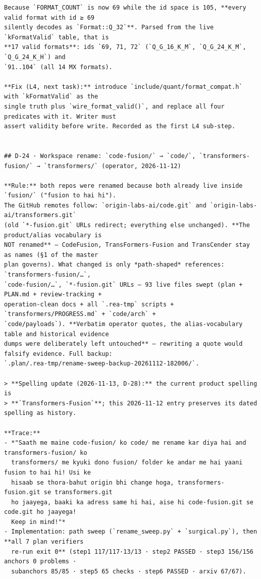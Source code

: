 \begin{verbatim}
Because `FORMAT_COUNT` is now 69 while the id space is 105, **every valid format with id ≥ 69
silently decodes as `Format::Q_32`**. Parsed from the live `kFormatValid` table, that is
**17 valid formats**: ids `69, 71, 72` (`Q_G_16_K_M`, `Q_G_24_K_M`, `Q_G_24_K_H`) and
`91..104` (all 14 MX formats).

**Fix (L4, next task):** introduce `include/quant/format_compat.h` with `kFormatValid` as the
single truth plus `wire_format_valid()`, and replace all four predicates with it. Writer must
assert validity before write. Recorded as the first L4 sub-step.


## D-24 · Workspace rename: `code-fusion/` → `code/`, `transformers-fusion/` → `transformers/` (operator, 2026-11-12)

**Rule:** both repos were renamed because both already live inside `fusion/` ("fusion to hai hi").
The GitHub remotes follow: `origin-labs-ai/code.git` and `origin-labs-ai/transformers.git`
(old `*-fusion.git` URLs redirect; everything else unchanged). **The product/alias vocabulary is
NOT renamed** — CodeFusion, TransFormers-Fusion and TransCender stay as names (§1 of the master
plan governs). What changed is only *path-shaped* references: `transformers-fusion/…`,
`code-fusion/…`, `*-fusion.git` URLs — 93 live files swept (plan + PLAN.md + review-tracking +
operation-clean docs + all `.rea-tmp` scripts + `transformers/PROGRESS.md` + `code/arch` +
`code/payloads`). **Verbatim operator quotes, the alias-vocabulary table and historical evidence
dumps were deliberately left untouched** — rewriting a quote would falsify evidence. Full backup:
`.plan/.rea-tmp/rename-sweep-backup-20261112-182006/`.

> **Spelling update (2026-11-13, D-28):** the current product spelling is
> **`Transformers-Fusion`**; this 2026-11-12 entry preserves its dated spelling as history.

**Trace:**
- *"Saath me maine code-fusion/ ko code/ me rename kar diya hai and transformers-fusion/ ko
  transformers/ me kyuki dono fusion/ folder ke andar me hai yaani fusion to hai hi! Usi ke
  hisaab se thora-bahut origin bhi change hoga, transformers-fusion.git se transformers.git
  ho jaayega, baaki ka adress same hi hai, aise hi code-fusion.git se code.git ho jaayega!
  Keep in mind!"*
- Implementation: path sweep (`rename_sweep.py` + `surgical.py`), then **all 7 plan verifiers
  re-run exit 0** (step1 117/117·13/13 · step2 PASSED · step3 156/156 anchors 0 problems ·
  subanchors 85/85 · step5 65 checks · step6 PASSED · arxiv 67/67).


\end{verbatim}
